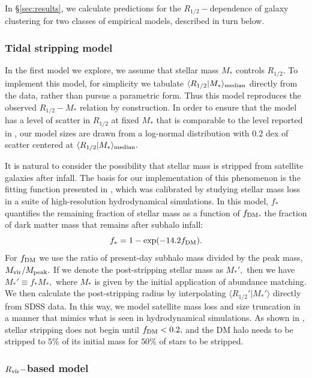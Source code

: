 \documentclass[usenatbib,usegraphicx,letterpaper]{mn2e}
\newcommand{\beq}{\begin{equation}}
\newcommand{\eeq}{\end{equation}}
\newcommand{\rhalf}{R_{1/2}}
\newcommand{\mstar}{M_{\ast}}
\newcommand{\rvir}{R_{\rm vir}}
\newcommand{\median}[2]{\langle{#1}\vert{#2}\rangle_{\rm median}}
\begin{document}
In \S\ref{sec:results}, we calculate predictions for the $\rhalf-$dependence of galaxy clustering for two classes of empirical models, described in turn below.

\subsubsection{Tidal stripping model}
\label{subsubsec:strippingmodel}

In the first model we explore, we assume that stellar mass $\mstar$ controls $\rhalf.$ To implement this model, for simplicity we tabulate $\median{\rhalf}{\mstar}$ directly from the data, rather than pursue a parametric form. Thus this model reproduces the observed $\rhalf-\mstar$ relation by construction. In order to ensure that the model has a level of scatter in $\rhalf$ at fixed $\mstar$ that is comparable to the level reported in \citet{somerville_etal17}, our model sizes are drawn from a log-normal distribution with $0.2$ dex of scatter centered at $\median{\rhalf}{\mstar}.$ 

It is natural to consider the possibility that stellar mass is stripped from satellite galaxies after infall. The basis for our implementation of this phenomenon is the fitting function presented in \citet{smith_etal16}, which was calibrated by studying stellar mass loss in a suite of high-resolution hydrodynamical simulations. In this model, $f_{\ast}$ quantifies the remaining fraction of stellar mass as a function of $f_{\rm DM},$ the fraction of dark matter mass that remains after subhalo infall:
\beq
f_{\ast} = 1 - \exp(-14.2f_{\rm DM}).
\eeq
For $f_{\rm DM}$ we use the ratio of present-day subhalo mass divided by the peak mass, $M_{\rm vir}/M_{\rm peak}.$ If we denote the post-stripping stellar mass as $M_{\ast}',$ then we have $M_{\ast}'\equiv f_{\ast}M_{\ast},$ where $M_{\ast}$ is given by the initial application of abundance matching. We then calculate the post-stripping radius by interpolating $\langle\rhalf'\vert\mstar'\rangle$ directly from SDSS data. In this way, we model satellite mass loss and  size truncation in a manner that mimics what is seen in hydrodynamical simulations. As shown in \citet{smith_etal16}, stellar stripping does not begin until $f_{\rm DM}<0.2,$ and the DM halo needs to be stripped to $5\%$ of its initial mass for $50\%$ of stars to be stripped.


\subsubsection{$\rvir-$based model}
\label{subsubsec:rvirmodel}
\end{document}
